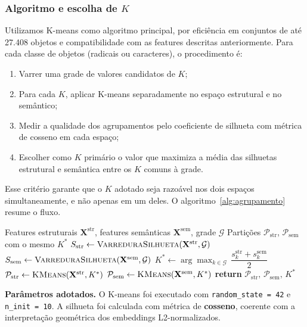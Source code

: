 \documentclass[10pt, a4paper, titlepage]{extarticle}
\begin{document}
\subsubsection{Algoritmo e escolha de $K$}
Utilizamos K-means como algoritmo principal, por eficiência em conjuntos de até 27.408 objetos e compatibilidade com as features descritas anteriormente. Para cada classe de objetos (radicais ou caracteres), o procedimento é:

\begin{enumerate}
    \item Varrer uma grade de valores candidatos de $K$;
    \item Para cada $K$, aplicar K-means separadamente no espaço estrutural e no semântico;
    \item Medir a qualidade dos agrupamentos pelo coeficiente de silhueta com métrica de cosseno em cada espaço;
    \item Escolher como $K$ primário o valor que maximiza a média das silhuetas estrutural e semântica entre os $K$ comuns à grade.
\end{enumerate}

Esse critério garante que o $K$ adotado seja razoável nos dois espaços simultaneamente, e não apenas em um deles. O algoritmo~\ref{alg:agrupamento} resume o fluxo.

\begin{algorithm}[H]
\caption{Agrupamento estrutural e semântico com $K$ pareado}
\label{alg:agrupamento}
\begin{algorithmic}[1]
\Require Features estruturais $\mathbf{X}^{\mathrm{str}}$, features semânticas
         $\mathbf{X}^{\mathrm{sem}}$, grade $\mathcal{G}$
\Ensure Partições $\mathcal{P}_{\mathrm{str}}$, $\mathcal{P}_{\mathrm{sem}}$
        com o mesmo $K^*$
\State $S_{\mathrm{str}} \gets \textsc{VarreduraSilhueta}(\mathbf{X}^{\mathrm{str}}, \mathcal{G})$
\State $S_{\mathrm{sem}} \gets \textsc{VarreduraSilhueta}(\mathbf{X}^{\mathrm{sem}}, \mathcal{G})$
\State $K^* \gets \arg\max_{k \in \mathcal{G}}\,
       \dfrac{s_k^{\mathrm{str}} + s_k^{\mathrm{sem}}}{2}$
\State $\mathcal{P}_{\mathrm{str}} \gets \textsc{KMeans}(\mathbf{X}^{\mathrm{str}}, K^*)$
\State $\mathcal{P}_{\mathrm{sem}} \gets \textsc{KMeans}(\mathbf{X}^{\mathrm{sem}}, K^*)$
\State \textbf{return} $\mathcal{P}_{\mathrm{str}},\, \mathcal{P}_{\mathrm{sem}},\, K^*$
\end{algorithmic}
\end{algorithm}

\textbf{Parâmetros adotados.} O K-means foi executado com
\texttt{random\_state = 42} e \texttt{n\_init = 10}. A silhueta foi calculada
com métrica de \textbf{cosseno}, coerente com a interpretação geométrica dos
embeddings L2-normalizados.
\end{document}
